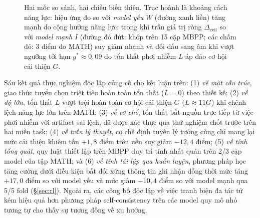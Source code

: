 \documentclass[11pt,a4paper]{article}
\newcommand{\dceil}{\Delta_{\mathrm{ceil}}}
\begin{document}
\begin{figure}[!ht]
\caption{Hai mốc so sánh, hai chiều biến thiên. Trục hoành là khoảng cách năng lực: hiệu ứng đo so với
\emph{model yếu} $W$ (đường xanh liền) tăng mạnh do cộng hưởng năng lực; trong khi trần giá trị ròng $\dceil$
so với \emph{model mạnh} $I$ (đường đỏ đứt: khớp trên 15 cặp MBPP; các chấm đỏ: 3 điểm đo MATH) suy giảm
nhanh và đổi dấu sang âm khi vượt ngưỡng tới hạn $g^\ast \approx 0{,}09$ do tổn thất phơi nhiễm $L$
áp đảo cơ hội cải thiện $G$.}
\label{fig:twobaselines}
\end{figure}

Sáu kết quả thực nghiệm độc lập củng cố cho kết luận trên: (1) \emph{về mặt cấu trúc}, giao thức 
tuyển chọn triệt tiêu hoàn toàn tổn thất ($L=0$) theo thiết kế; (2) \emph{về độ lớn}, tổn thất $L$
vượt trội hoàn toàn cơ hội cải thiện $G$ ($L \approx 11G$) khi chênh lệch năng lực lớn trên MATH;
(3) \emph{về cơ chế}, tổn thất bắt nguồn trực tiếp từ việc phơi nhiễm với artifact sai lệch,
đã được xác thực qua thử nghiệm chốt trước trên hai miền task; (4) \emph{về trần lý thuyết},
cơ chế định tuyến lý tưởng cũng chỉ mang lại mức cải thiện khiêm tốn $+1{,}8$ điểm trên
nền suy giảm $-12{,}4$ điểm; (5) \emph{về tính tổng quát}, quy luật thiết lập trên MBPP duy trì
tính nhất quán trên 2/3 cặp model của tập MATH; và (6) \emph{về tính tái lập qua huấn luyện},
phương pháp học tăng cường dưới điều kiện bất đối xứng thông tin ghi nhận đồng thời mức tăng
$+17{,}0$ điểm so với model yếu và mức giảm $-10{,}4$ điểm so với model mạnh qua 5/5 fold
(\S\ref{sec:rl}). Ngoài ra, các công bố độc lập về việc tranh biện đa tác tử kém hiệu quả hơn
phương pháp self-consistency trên các model quy mô nhỏ \cite{chen2025debate} tương tự cho thấy sự tương
đồng về xu hướng.
\end{document}
